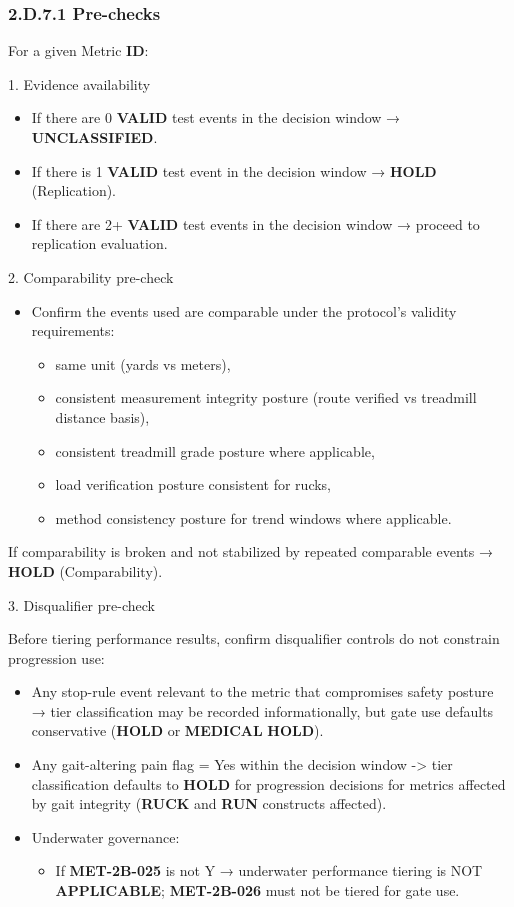 \documentclass[10pt]{article}
\begin{document}
\subsubsection*{2.D.7.1 Pre-checks}

For a given Metric \textbf{ID}:

1. Evidence availability

\begin{itemize}
\item If there are 0 \textbf{VALID} test events in the decision window → \textbf{UNCLASSIFIED}.
\item If there is 1 \textbf{VALID} test event in the decision window → \textbf{HOLD} (Replication).
\item If there are 2+ \textbf{VALID} test events in the decision window → proceed to replication evaluation.
\end{itemize}

2. Comparability pre-check

\begin{itemize}
\item Confirm the events used are comparable under the protocol’s validity requirements:
  \begin{itemize}
  \item same unit (yards vs meters),
  \item consistent measurement integrity posture (route verified vs treadmill distance basis),
  \item consistent treadmill grade posture where applicable,
  \item load verification posture consistent for rucks,
  \item method consistency posture for trend windows where applicable.
  \end{itemize}
\end{itemize}

If comparability is broken and not stabilized by repeated comparable events → \textbf{HOLD} (Comparability).

3. Disqualifier pre-check

Before tiering performance results, confirm disqualifier controls do not constrain progression use:

\begin{itemize}
\item Any stop-rule event relevant to the metric that compromises safety posture → tier classification may be recorded informationally, but gate use defaults conservative (\textbf{HOLD} or \textbf{MEDICAL} \textbf{HOLD}).
\item Any gait-altering pain flag = Yes within the decision window -> tier classification defaults to \textbf{HOLD} for progression decisions for metrics affected by gait integrity (\textbf{RUCK} and \textbf{RUN} constructs affected).
\item Underwater governance:
  \begin{itemize}
  \item If \textbf{MET-2B-025} is not Y → underwater performance tiering is NOT \textbf{APPLICABLE}; \textbf{MET-2B-026} must not be tiered for gate use.
  \end{itemize}
\end{itemize}
\end{document}

